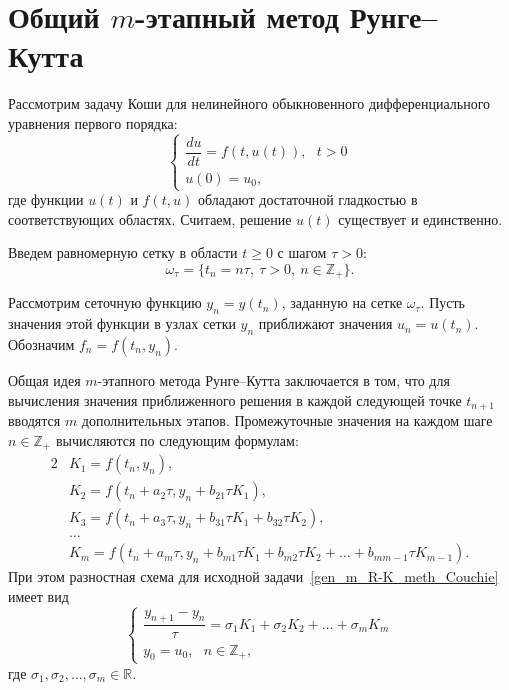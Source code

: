 \documentclass[11pt,a4paper,twoside,listtotoc,bibtotoc]{report}
\numberwithin{equation}{section}
\theoremstyle{definition}
\theoremstyle{plain}
\begin{document}
\section{Общий $m$-этапный метод Рунге--Кутта}
%
%
Рассмотрим задачу Коши для нелинейного обыкновенного дифференциального
уравнения первого порядка:
%
\begin{equation}
    \label{gen_m_R-K_meth_Couchie}
    \begin{cases}
        \dfrac{du}{dt} = f(t,u(t)),~~~t>0 \\
        u(0) = u_0,
    \end{cases}
\end{equation}
%
где функции $u(t)$ и $f(t, u)$ обладают достаточной гладкостью в соответствующих
областях. Считаем, решение $u(t)$ существует и единственно.

Введем равномерную сетку в области $t\geqslant 0$ с шагом $\tau > 0$:
%
$$
    \omega_\tau=\{t_n=n\tau,~\tau > 0,~n\in\mathbb{Z}_+\}.
$$

Рассмотрим сеточную функцию $y_n = y(t_n)$, заданную
на сетке $\omega_\tau$. Пусть значения этой функции в узлах сетки $y_n$ приближают
значения $u_n=u(t_n)$. Обозначим $f_n=f(t_n,y_n)$.

Общая идея $m$-этапного метода Рунге--Кутта заключается в том, что
для вычисления значения приближенного решения в каждой следующей точке $t_{n+1}$
вводятся $m$ дополнительных этапов.
Промежуточные значения на каждом шаге $n\in\mathbb{Z}_+$ вычисляются по
следующим формулам:
%
\begin{alignat*}{2}
%
    &K_1 = f(t_n, y_n), \\
    &K_2 = f(t_n + a_2\tau, y_n + b_{21} \tau K_1), \\
    &K_3 = f(t_n + a_3\tau, y_n + b_{31}\tau K_1 + b_{32}\tau K_2), \\
    &\dots \\
    &K_m = f(t_n+a_m\tau, y_n + b_{m1} \tau K_1 + b_{m2} \tau K_2 + \ldots + b_{m m -1} \tau K_{m-1}).
%
\end{alignat*}
%
При этом разностная схема для исходной задачи~\eqref{gen_m_R-K_meth_Couchie}
имеет вид
%
\begin{equation}
    \label{gen_Runge-Kutt_meth}
    \begin{cases}
        \dfrac{y_{n+1} - y_n}{\tau} = \sigma_1 K_1 + \sigma_2 K_2 + \ldots + \sigma_m K_m \\
        y_0 = u_0,~~~n \in \mathbb{Z}_+,
    \end{cases}
\end{equation}
%
где $\sigma_1, \sigma_2, \ldots, \sigma_m \in\mathbb{R}$.
\end{document}
